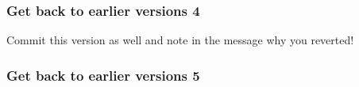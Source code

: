 \documentclass[12pt,english]{beamer}
\begin{document}
\begin{frame}
\frametitle{Get back to earlier versions 4}

\begin{center}
\end{center}

Commit this version as well and note in the message why you reverted!

\end{frame}

\begin{frame}
\frametitle{Get back to earlier versions 5}

\begin{center}
\end{center}

\end{frame}
\end{document}
